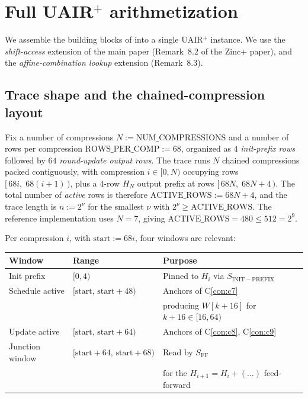 \section{Full UAIR$^+$ arithmetization}\label{sec:uair}

We assemble the building blocks of  into a single
UAIR$^+$ instance. We use the \emph{shift-access} extension of the main
paper (Remark~8.2 of the Zinc+ paper), and the
\emph{affine-combination lookup} extension (Remark~8.3).

\subsection{Trace shape and the chained-compression layout}\label{sec:trace-shape}

Fix a number of compressions $N := \mathrm{NUM\_COMPRESSIONS}$ and a
number of rows per compression
$\mathrm{ROWS\_PER\_COMP} := 68$, organized as $4$ \emph{init-prefix
rows} followed by $64$ \emph{round-update output rows}. The trace runs
$N$ chained compressions packed contiguously, with compression
$i \in [0,N)$ occupying rows
$[\,68i,\;68(i+1)\,)$, plus a $4$-row $H_N$ output prefix at rows
$[\,68N,\;68N+4\,)$.
The total number of \emph{active} rows is therefore
$\mathrm{ACTIVE\_ROWS} := 68 N + 4$, and the trace length is
$n := 2^{\nu}$ for the smallest $\nu$ with
$2^{\nu} \ge \mathrm{ACTIVE\_ROWS}$.
The reference implementation uses $N=7$, giving
$\mathrm{ACTIVE\_ROWS} = 480 \le 512 = 2^9$.

Per compression $i$, with $\mathrm{start} := 68i$, four windows are
relevant:
\begin{center}
\begin{tabular}{lll}
\toprule
\textbf{Window} & \textbf{Range} & \textbf{Purpose} \\
\midrule
Init prefix     & $[0, 4)$  & Pinned to $H_i$ via $S_{\mathrm{INIT-PREFIX}}$ \\
Schedule active & $[\mathrm{start},\,\mathrm{start}+48)$ & Anchors of C\ref{con:c7}\\ & & \quad producing $W[k+16]$ for $k+16 \in [16,64)$ \\
Update active   & $[\mathrm{start},\,\mathrm{start}+64)$ & Anchors of C\ref{con:c8}, C\ref{con:c9} \\
Junction window & $[\mathrm{start}+64,\,\mathrm{start}+68)$ & Read by $S_{\mathrm{FF}}$\\ & & \quad for the $H_{i+1} = H_i + (\dots)$ feed-forward \\
\bottomrule
\end{tabular}
\end{center}

